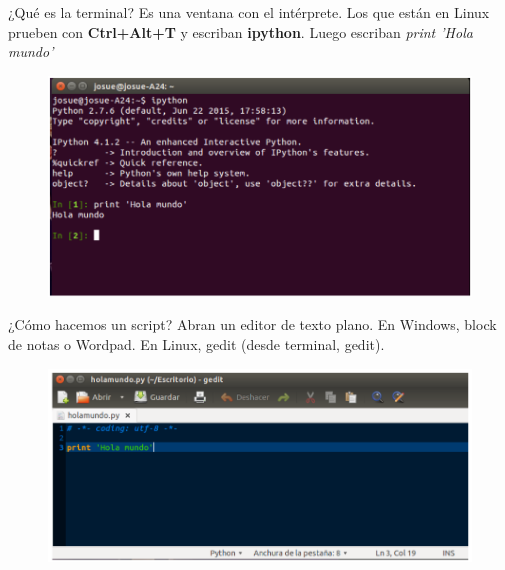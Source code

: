 \documentclass{beamer}
\begin{document}
\begin{frame}{¿Qué es la terminal?}
    Es una ventana con el intérprete. Los que están en Linux prueben
con \textbf{Ctrl+Alt+T} y escriban \textbf{ipython}. Luego escriban \textit{print ’Hola
mundo’}
        \begin{figure}
    \centering
    \includegraphics[width=\textwidth]{fig/terminal_HolaMundo.png}
    \end{figure}
    
\end{frame}

\begin{frame}{¿Cómo hacemos un script?}
    Abran un editor de texto plano. En Windows, block de notas o
Wordpad. En Linux, gedit (desde terminal, gedit).
        \begin{figure}
    \centering
    \includegraphics[width=\textwidth]{fig/script.png}
    \end{figure}
\end{frame}
\end{document}
